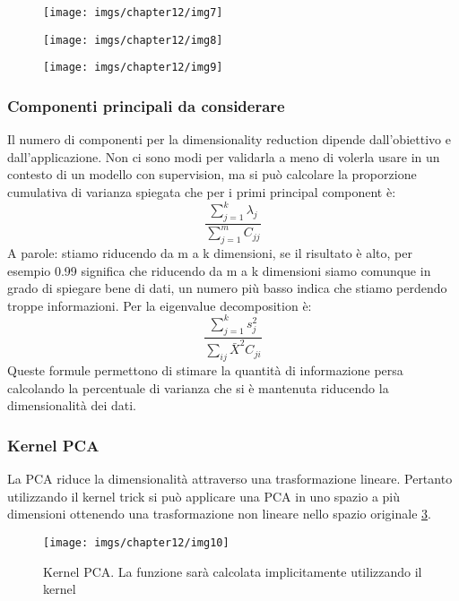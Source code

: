 		\begin{figure}
			\centering
			\begin{minipage}{.5\textwidth}
				\centering
				\texttt{[image: imgs/chapter12/img7]}
				\caption{}
				\label{fig:chapter12-07}
			\end{minipage}%
			\begin{minipage}{.5\textwidth}
				\centering
				\texttt{[image: imgs/chapter12/img8]}
				\caption{}
				\label{fig:chapter12-08}
			\end{minipage}
		\end{figure}
		
		\begin{figure}
			\centering
			\texttt{[image: imgs/chapter12/img9]}
			\caption{}
			\label{fig:chapter12-09}
		\end{figure}
		
		\subsubsection{Componenti principali da considerare}
		Il numero di componenti per la dimensionality reduction dipende dall'obiettivo e dall'applicazione.
		Non ci sono modi per validarla a meno di volerla usare in un contesto di un modello con supervision, ma si pu\`o calcolare la proporzione cumulativa di varianza spiegata che per i primi principal component \`e:
		$$\frac{\sum\limits_{j = 1}^k\lambda_j}{\sum\limits_{j = 1}^m C_{jj}}$$
		A parole: stiamo riducendo da m a k dimensioni, se il risultato \`e alto, per esempio 0.99 significa che riducendo da m a k dimensioni siamo comunque in grado di spiegare bene di dati, un numero pi\`u basso indica che stiamo perdendo troppe informazioni.
		Per la eigenvalue decomposition \`e:
		$$\frac{\sum\limits_{j = 1}^ks^2_j}{\sum\limits_{ij} \bar{X}^2C_{ji}}$$
		Queste formule permettono di stimare la quantit\`a di informazione persa calcolando la percentuale di varianza che si \`e mantenuta riducendo la dimensionalit\`a dei dati.
		
		\subsubsection{Kernel PCA}
		La PCA riduce la dimensionalit\`a attraverso una trasformazione lineare.
		Pertanto utilizzando il kernel trick si pu\`o applicare una PCA in uno spazio a pi\`u dimensioni ottenendo una trasformazione non lineare nello spazio originale \ref{fig:chapter12-10}.
		\begin{figure}
			\centering
			\texttt{[image: imgs/chapter12/img10]}
			\caption{Kernel PCA. La funzione sar\`a calcolata implicitamente utilizzando il kernel}
			\label{fig:chapter12-10}
		\end{figure}
